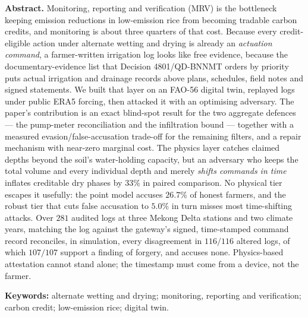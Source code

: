   \vspace{6pt}
  \begin{hujosabstract}
  \noindent\textbf{Abstract.} Monitoring, reporting and verification (MRV) is the bottleneck keeping emission
 reductions in low-emission rice from becoming tradable carbon credits, and
 monitoring is about three quarters of that cost. Because every credit-eligible
 action under alternate wetting and drying is already an \emph{actuation command},
 a farmer-written irrigation log looks like free evidence, because the documentary-evidence list that Decision 4801/QD-BNNMT orders by priority puts actual irrigation and drainage records above plans, schedules, field notes and signed statements. We built that layer on an FAO-56 digital twin, replayed logs under public ERA5 forcing, then attacked it with an optimising adversary. The paper's contribution is an exact blind-spot result for the two aggregate
 defences --- the pump-meter reconciliation and the infiltration bound --- together
 with a measured evasion/false-accusation trade-off for the remaining filters, and a
 repair mechanism with near-zero marginal cost. The physics layer catches claimed depths beyond the soil's water-holding capacity, but an adversary who keeps the
 total volume and every individual depth and merely \emph{shifts commands in time}
 inflates creditable dry phases by $33\%$ in paired comparison. No physical tier
 escapes it usefully: the point model accuses $26.7\%$ of honest farmers, and the
 robust tier that cuts false accusation to $5.0\%$ in turn misses most
 time-shifting attacks. Over $281$ audited logs at three Mekong Delta stations
 and two climate years, matching the log against the gateway's signed,
 time-stamped command record reconciles, in simulation, every disagreement in
 $116/116$
 altered logs, of which $107/107$ support a finding of forgery, and accuses
 none.
 Physics-based attestation cannot stand alone; the timestamp must come from
 a device, not the farmer.

 \vspace{4pt}
 \noindent\textbf{Keywords:} alternate wetting and drying; monitoring, reporting
  and verification; carbon credit; low-emission rice; digital twin.

  \vspace{10pt}
  \end{hujosabstract}
\endgroup





